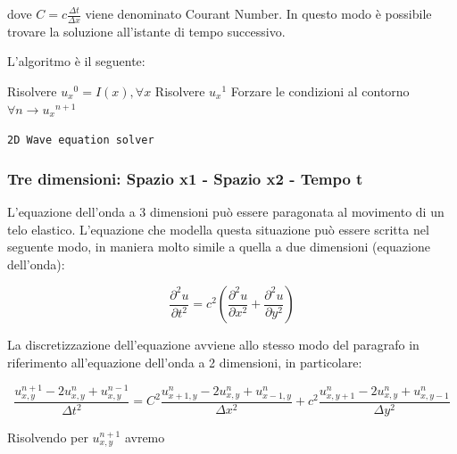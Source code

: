 \documentclass{article}
\begin{document}
dove $C=c \frac{\Delta t}{\Delta x}$ viene denominato Courant Number. 
In questo modo è possibile trovare la soluzione all'istante di tempo successivo.

L'algoritmo è il seguente:

\begin{center}
	\begin{minipage}{0.5\linewidth} %
		\begin{algorithm}[H]
			\medskip
			Risolvere $u{_x}^0=I(x), \forall x$\;
			Risolvere $u{_x}^1$\;
			Forzare le condizioni al contorno \;
			$\forall n \rightarrow u{_x}^{n+1}$ \;
			\caption{\texttt{2D Wave equation solver}} %
			\label{alg:2D Wave equation solver}   %
		\end{algorithm}
	\end{minipage}
\end{center}


\subsubsection{Tre dimensioni: Spazio x1 - Spazio x2 - Tempo t}
L'equazione dell'onda a 3 dimensioni può essere paragonata al movimento di un telo elastico. L'equazione che modella questa situazione può essere scritta nel seguente modo, in maniera molto simile a quella a due dimensioni (equazione dell'onda):

\begin{equation}
	\frac{\partial^2u}{\partial t^2} = c^2(\frac{\partial^2u}{\partial x^2} + \frac{\partial^2u}{\partial y^2})
\end{equation}

La discretizzazione dell'equazione avviene allo stesso modo del paragrafo in riferimento all'equazione dell'onda a 2 dimensioni, in particolare:

\begin{equation}
\frac{u_{x,y}^{n+1}-2u_{x,y}^n+u_{x,y}^{n-1}}{\Delta t^2}=C^2\frac{u_{x+1,y}^n-2u_{x,y}^n+u_{x-1,y}^n}{\Delta x^2}+c^2\frac{u_{x,y+1}^n-2u_{x,y}^n+u_{x,y-1}^n}{\Delta y^2}
\end{equation}

Risolvendo per $u_{x,y}^{n+1}$ avremo
\end{document}
